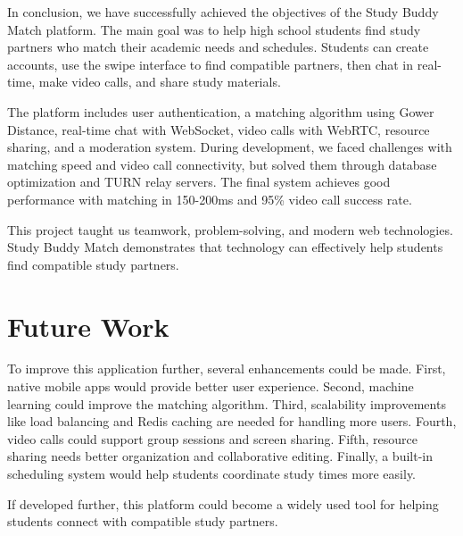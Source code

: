 \documentclass[a4paper,12pt]{report}
\begin{document}
In conclusion, we have successfully achieved the objectives of the Study Buddy Match platform. The main goal was to help high school students find study partners who match their academic needs and schedules. Students can create accounts, use the swipe interface to find compatible partners, then chat in real-time, make video calls, and share study materials.

The platform includes user authentication, a matching algorithm using Gower Distance, real-time chat with WebSocket, video calls with WebRTC, resource sharing, and a moderation system. During development, we faced challenges with matching speed and video call connectivity, but solved them through database optimization and TURN relay servers. The final system achieves good performance with matching in 150-200ms and 95\% video call success rate.

This project taught us teamwork, problem-solving, and modern web technologies. Study Buddy Match demonstrates that technology can effectively help students find compatible study partners.

\section{Future Work}

To improve this application further, several enhancements could be made. First, native mobile apps would provide better user experience. Second, machine learning could improve the matching algorithm. Third, scalability improvements like load balancing and Redis caching are needed for handling more users. Fourth, video calls could support group sessions and screen sharing. Fifth, resource sharing needs better organization and collaborative editing. Finally, a built-in scheduling system would help students coordinate study times more easily.

If developed further, this platform could become a widely used tool for helping students connect with compatible study partners.
\end{document}
